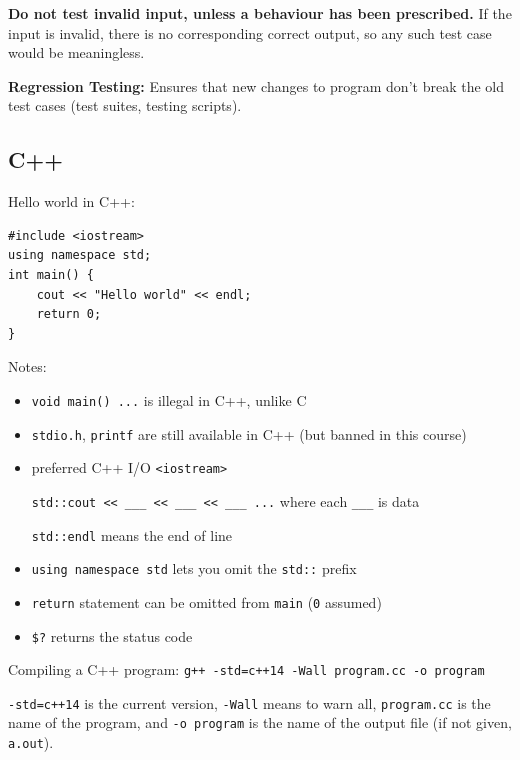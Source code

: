 \documentclass[11pt]{article}
\theoremstyle{definition}
\begin{document}
{\bf Do not test invalid input, unless a behaviour has been prescribed.} If the input is invalid, there is no corresponding correct output, so any such test case would be meaningless.

{\bf Regression Testing:} Ensures that new changes to program don't break the old test cases (test suites, testing scripts).

\subsection{C++}

Hello world in C++:
\begin{lstlisting}
#include <iostream>
using namespace std;
int main() {
    cout << "Hello world" << endl;
    return 0;
}
\end{lstlisting}
Notes: \vspace{-0.25cm}
\begin{itemize}

    \item {\tt void main() ...} is illegal in C++, unlike C
    
    \item {\tt stdio.h}, {\tt printf} are still available in C++ (but banned in this course)
    
    \item preferred C++ I/O {\tt <iostream>}
    
    {\tt std::cout <\null< \_\_\_ <\null< \_\_\_ <\null< \_\_\_ ...} where each {\tt \_\_\_} is data
    
    {\tt std::endl} means the end of line
    
    \item {\tt using namespace std} lets you omit the {\tt std::} prefix
    
    \item {\tt return} statement can be omitted from {\tt main} ({\tt 0} assumed)
    
    \item {\tt \$?} returns the status code
    
\end{itemize}
\vspace{-0.25cm}
Compiling a C++ program: {\tt g++ -std=c++14 -Wall program.cc -o program}

{\tt -std=c++14} is the current version, {\tt -Wall} means to warn all, {\tt program.cc} is the name of the program, and {\tt -o program} is the name of the output file (if not given, {\tt a.out}). 
\end{document}
